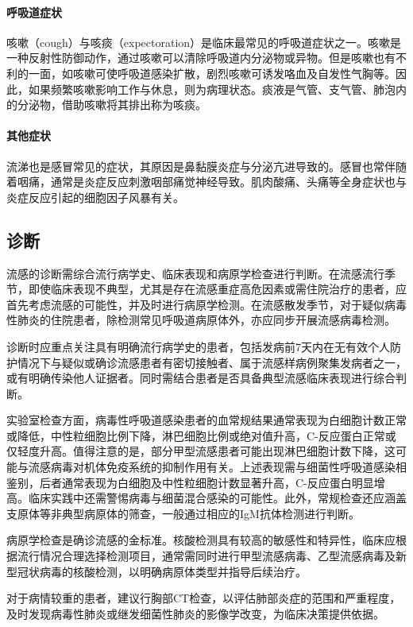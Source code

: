 \documentclass[9pt,a4paper,twoside]{rho-class/rho}
\begin{document}
    \paragraph{呼吸道症状} 咳嗽（cough）与咳痰（expectoration）是临床最常见的呼吸道症状之一。咳嗽是一种反射性防御动作，通过咳嗽可以清除呼吸道内分泌物或异物。但是咳嗽也有不利的一面，如咳嗽可使呼吸道感染扩散，剧烈咳嗽可诱发咯血及自发性气胸等。因此，如果频繁咳嗽影响工作与休息，则为病理状态。痰液是气管、支气管、肺泡内的分泌物，借助咳嗽将其排出称为咳痰。

    \paragraph{其他症状} 流涕也是感冒常见的症状，其原因是鼻黏膜炎症与分泌亢进导致的。感冒也常伴随着咽痛，通常是炎症反应刺激咽部痛觉神经导致。肌肉酸痛、头痛等全身症状也与炎症反应引起的细胞因子风暴有关。

\subsection{诊断}

    流感的诊断需综合流行病学史、临床表现和病原学检查进行判断。在流感流行季节，即使临床表现不典型，尤其是存在流感重症高危因素或需住院治疗的患者，应首先考虑流感的可能性，并及时进行病原学检测。在流感散发季节，对于疑似病毒性肺炎的住院患者，除检测常见呼吸道病原体外，亦应同步开展流感病毒检测。
    
    诊断时应重点关注具有明确流行病学史的患者，包括发病前7天内在无有效个人防护情况下与疑似或确诊流感患者有密切接触者、属于流感样病例聚集发病者之一，或有明确传染他人证据者。同时需结合患者是否具备典型流感临床表现进行综合判断。
    
    实验室检查方面，病毒性呼吸道感染患者的血常规结果通常表现为白细胞计数正常或降低，中性粒细胞比例下降，淋巴细胞比例或绝对值升高，C-反应蛋白正常或仅轻度升高。值得注意的是，部分甲型流感患者可能出现淋巴细胞计数下降，这可能与流感病毒对机体免疫系统的抑制作用有关。上述表现需与细菌性呼吸道感染相鉴别，后者通常表现为白细胞及中性粒细胞计数显著升高，C-反应蛋白明显增高。临床实践中还需警惕病毒与细菌混合感染的可能性。此外，常规检查还应涵盖支原体等非典型病原体的筛查，一般通过相应的IgM抗体检测进行判断。
    
    病原学检查是确诊流感的金标准。核酸检测具有较高的敏感性和特异性，临床应根据流行情况合理选择检测项目，通常需同时进行甲型流感病毒、乙型流感病毒及新型冠状病毒的核酸检测，以明确病原体类型并指导后续治疗。
    
    对于病情较重的患者，建议行胸部CT检查，以评估肺部炎症的范围和严重程度，及时发现病毒性肺炎或继发细菌性肺炎的影像学改变，为临床决策提供依据。
\end{document}
